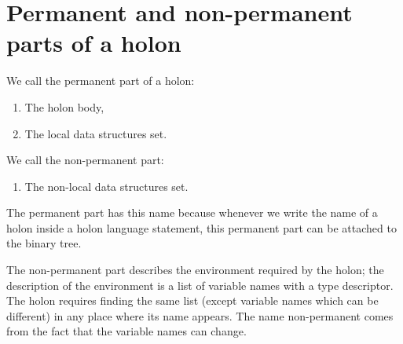 \documentclass[openany,nobib]{tufte-book}
\begin{document}
\medskip
{}

\begin{marginfigure}
\caption{A holon with data structures declared after the ``initial''
operation.}
\label{fig:initial}
\end{marginfigure}

\section{Permanent and non-permanent parts of a holon}

We call the permanent part of a holon:
\begin{enumerate}
    \item The holon body,
    \item The local data structures set.
\end{enumerate}

We call the non-permanent part:
\begin{enumerate}
    \item The non-local data structures set.
\end{enumerate}

The permanent part has this name because whenever we write the name of a holon
inside a holon language statement, this permanent part can be attached to the
binary tree.

The non-permanent part describes the environment required by the holon; the
description of the environment is a list of variable names with a type
descriptor. The holon requires finding the same list (except variable names
which can be different) in any place where its name appears. The name
non-permanent comes from the fact that the variable names can change.
\end{document}
